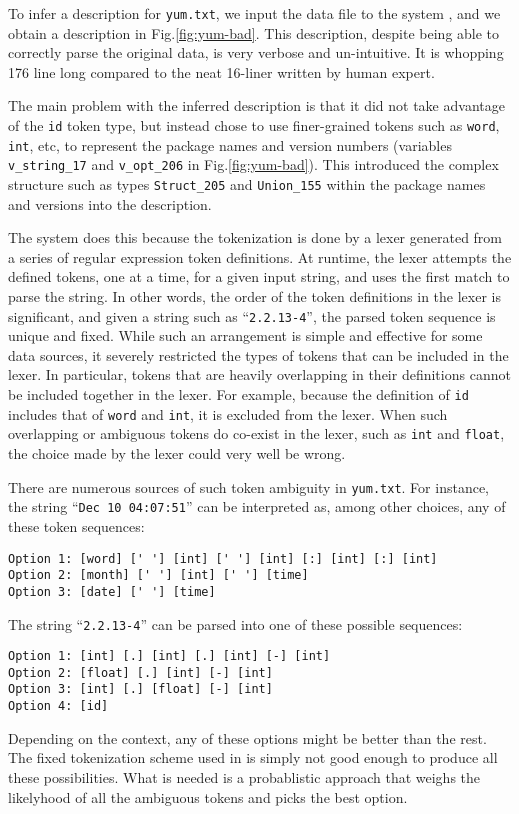  
To infer a \pads{} description for {\tt yum.txt},
we input the data file to the \learnpads{} system 
\cite{fisher+:dirttoshovels,fisher+:sigmod08}, and we obtain
a description in Fig.\ref{fig:yum-bad}.
This description, despite being able to correctly parse the original data,
is very verbose and un-intuitive. It is whopping 176 line long compared 
to the neat 16-liner written by human expert.

The main problem with the inferred description is that it 
did not take advantage of the {\tt id} token type, but instead chose
to use finer-grained tokens such as {\tt word}, {\tt int}, etc,
to represent the package names and version numbers (variables
\verb#v_string_17# and \verb#v_opt_206# in Fig.\ref{fig:yum-bad}). 
This introduced the
complex structure such as types \verb#Struct_205# and \verb#Union_155#
within the package names and versions into the description. 

The \learnpads{} system does this because 
the tokenization is done by
a lexer generated from a series of regular expression token definitions.
At runtime, the lexer attempts the defined tokens, one at
a time, for a given input string, and uses the first match to parse the
string.  In other words, the order of the token definitions in the lexer
is significant, and given a string such as ``{\tt 2.2.13-4}'', the parsed
token sequence is unique and fixed. While such an arrangement is simple
and effective for some data sources, it severely restricted the types of
tokens that can be included in the lexer. In particular, tokens that are
heavily overlapping in their definitions cannot be included together in the lexer.
For example, because the definition of {\tt id} includes that of
{\tt word} and  {\tt int}, it is excluded from the lexer. 
When such overlapping or ambiguous tokens do co-exist in the lexer, such as
{\tt int} and {\tt float},
the choice made by the lexer could very well be wrong.

There are numerous sources of such token ambiguity 
in {\tt yum.txt}. For instance, the string ``{\tt Dec 10 04:07:51}'' 
can be interpreted as, among other choices, any of these
token sequences:

{\small
\begin{verbatim}
Option 1: [word] [' '] [int] [' '] [int] [:] [int] [:] [int]
Option 2: [month] [' '] [int] [' '] [time]
Option 3: [date] [' '] [time]
\end{verbatim}
}

The string ``{\tt 2.2.13-4}'' can be parsed into one of 
these possible sequences:
{\small
\begin{verbatim}
Option 1: [int] [.] [int] [.] [int] [-] [int]
Option 2: [float] [.] [int] [-] [int]
Option 3: [int] [.] [float] [-] [int]
Option 4: [id]
\end{verbatim}
}

Depending on the context, any of these options might be better than
the rest.  The fixed tokenization scheme used in \learnpads{} is simply
not good enough to produce all these possibilities. What is needed
is a probablistic approach that weighs the likelyhood of all the ambiguous
tokens and picks the best option.
